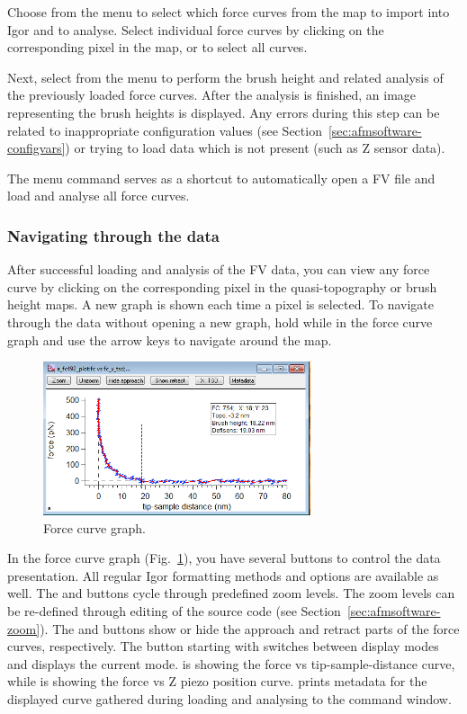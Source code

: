 \documentclass[12pt,a4paper]{article}
\begin{document}
Choose  from the menu to select which force curves from the map to import into Igor and to analyse. Select individual force curves by clicking on the corresponding pixel in the map, or  to select all curves.

Next, select  from the menu to perform the brush height and related analysis of the previously loaded force curves.
After the analysis is finished, an image representing the brush heights is displayed.
Any errors during this step can be related to inappropriate configuration values (see Section~\ref{sec:afmsoftware-configvars}) or trying to load data which is not present (such as Z sensor data).

The menu command  serves as a shortcut to automatically open a FV file and load and analyse all force curves.

\subsubsection{Navigating through the data}
After successful loading and analysis of the FV data, you can view any force curve by clicking on the corresponding pixel in the quasi-topography or brush height maps. A new graph is shown each time a pixel is selected.
To navigate through the data without opening a new graph, hold  while in the force curve graph and use the arrow keys to navigate around the map.

\begin{figure}[htbp]
	\centering
		\includegraphics[width=0.7\textwidth]{fig--afmsoftware-fc-graph.png}
	\caption[Force curve graph]{Force curve graph.}
	\label{fig:afmsoftware-fcgraph}
\end{figure}

In the force curve graph (Fig.~\ref{fig:afmsoftware-fcgraph}), you have several buttons to control the data presentation. All regular Igor formatting methods and options are available as well.
The  and  buttons cycle through predefined zoom levels. The zoom levels can be re-defined through editing of the source code (see Section~\ref{sec:afmsoftware-zoom}).
The  and  buttons show or hide the approach and retract parts of the force curves, respectively.
The button starting with  switches between display modes and displays the current mode.  is showing the force vs tip-sample-distance curve, while  is showing the force vs Z piezo position curve.
 prints metadata for the displayed curve gathered during loading and analysing to the command window.
\end{document}
